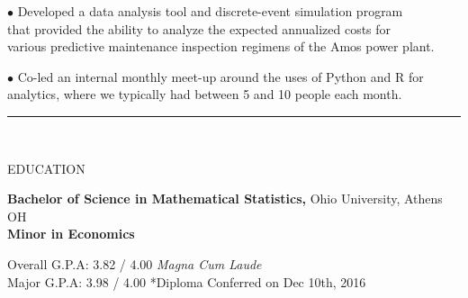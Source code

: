 \documentclass[12pt]{article}
\newcommand\tab[1][1cm]{\hspace*{#1}}
\newcommand\header[1][Section Header]{
    \vspace*{-2mm}
    \rule{6.5in}{3pt} \\
    \smallskip
    \begin{large}
	    \textsc{\textcolor{lblue}{#1}}
    \end{large}
    \medskip
}
\begin{document}
\begin{flushleft}
    \tab $\bullet$ Developed a data analysis tool and discrete-event simulation program \\
    \tab[1.25cm] that provided the ability to analyze the expected annualized costs for \\
    \tab[1.25cm] various predictive maintenance inspection regimens of the Amos power plant. \\
    \vspace*{0.5mm}

    \tab $\bullet$ Co-led an internal monthly meet-up around the uses of Python and R for \\
    \tab[1.25cm] analytics, where we typically had between 5 and 10 people each month. \\
    \medskip

    \smallskip
  \end{flushleft}

  \begin{flushleft}
    \header[EDUCATION]

    \textbf{Bachelor of Science in Mathematical Statistics,} \hfill Ohio University, Athens OH \\
    \textbf{Minor in Economics}

    \tab[0.5cm] Overall G.P.A:  3.82 / 4.00 \tab[0.25cm] \textit{Magna Cum Laude} \\
    \tab[0.5cm] \hspace*{2.08mm}Major G.P.A: 3.98 / 4.00  \hfill \small{*Diploma Conferred on Dec 10th, 2016}

    \smallskip
  \end{flushleft}
  
\end{document}
